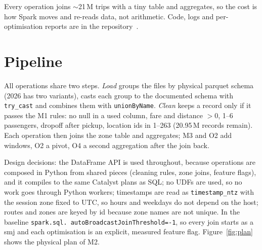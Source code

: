 \documentclass[sigconf]{acmart}
\begin{document}
Every operation joins $\sim$21\,M trips with a tiny table and aggregates, so
the cost is how Spark moves and re-reads data, not arithmetic. Code, logs and
per-optimisation reports are in the repository~\cite{repo}.

\section{Pipeline}

All operations share two steps. \emph{Load} groups the files by physical
parquet schema (2026 has two variants), casts each group to the documented
schema with \texttt{try\_cast} and combines them with \texttt{unionByName}.
\emph{Clean} keeps a record only if it passes the M1 rules: no null in a used
column, fare and distance $>0$, 1--6 passengers, dropoff after pickup, location
ids in 1--263 (20.95\,M records remain). Each operation then joins the zone
table and aggregates; M3 and O2 add windows, O2 a pivot, O4 a second
aggregation after the join back.

Design decisions: the DataFrame API is used throughout, because operations are
composed in Python from shared pieces (cleaning rules, zone joins, feature
flags), and it compiles to the same Catalyst plans as SQL; no UDFs are used, so
no work goes through Python workers; timestamps are read as
\texttt{timestamp\_ntz} with the session zone fixed to UTC, so hours and
weekdays do not depend on the host; routes and zones are keyed by id because
zone names are not unique. In the baseline \texttt{spark.sql.\allowbreak
      autoBroadcast\allowbreak JoinThreshold=-1}, so every join starts as a \gls{smj}
and each optimisation is an explicit, measured feature flag.
Figure~\ref{fig:plan} shows the physical plan of M2.
\end{document}
